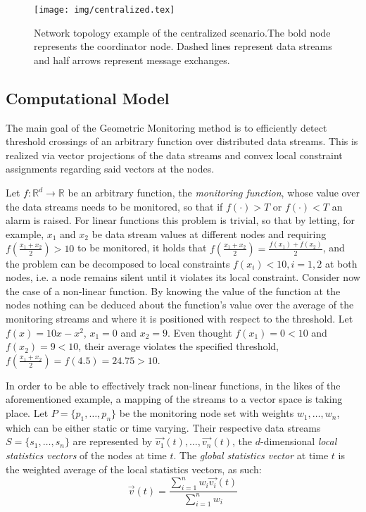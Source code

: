 \begin{figure}[H]
\centering
\texttt{[image: img/centralized.tex]}
\caption{Network topology example of the centralized scenario.The bold node represents the coordinator node. Dashed lines represent data streams and half arrows represent message exchanges.} 
\label{fig:centralized}
\end{figure}

\subsection{Computational Model} \label{subsec:theorBack-GM-compMod}

The main goal of the Geometric Monitoring method is to efficiently detect threshold crossings of an arbitrary function over distributed data streams. This is realized via vector projections of the data streams and convex local constraint assignments regarding said vectors at the nodes.

Let $f:\mathbb{R}^d \to \mathbb{R}$ be an arbitrary function, the \emph{monitoring function}, whose value over the data streams needs to be monitored, so that if $f(\cdot)>T$ or $f(\cdot)<T$ an alarm is raised. For linear functions this problem is trivial, so that by letting, for example, $x_1$ and $x_2$ be data stream values at different nodes and requiring $f(\frac{x_1+x_2}{2})>10$ to be monitored, it holds that $f(\frac{x_1+x_2}{2})=\frac{f(x_1)+f(x_2)}{2}$, and the problem can be decomposed to local constraints $f(x_i)<10, i=1,2$ at both nodes, i.e. a node remains silent until it violates its local constraint. Consider now the case of a non-linear function. By knowing the value of the function at the nodes nothing can be deduced about the function's value over the average of the monitoring streams and where it is positioned with respect to the threshold. Let $f(x)=10x-x^2$, $x_1=0$ and $x_2=9$. Even thought $f(x_1)=0<10$ and $f(x_2)=9<10$, their average violates the specified threshold, $f(\frac{x_1+x_2}{2})=f(4.5)=24.75>10$. 

In order to be able to effectively track non-linear functions, in the likes of the aforementioned example, a mapping of the streams to a vector space is taking place. Let $P=\{p_1, \dots, p_n\}$ be the monitoring node set with weights $w_1, \dots, w_n$, which can be either static or time varying. Their respective data streams $S=\{s_1, \dots, s_n\}$ are represented by $\vec{v_1}(t), \dots, \vec{v_n}(t)$, the $d$-dimensional \emph{local statistics vectors} of the nodes at time $t$. The \emph{global statistics vector} at time $t$ is the weighted average of the local statistics vectors, as such:
\begin{equation}
\vec{v}(t)=\frac{\sum_{i=1}^n{w_i\vec{v_i}(t)}}{\sum_{i=1}^n{w_i}}
\label{form:globalStatsVector}
\end{equation}

